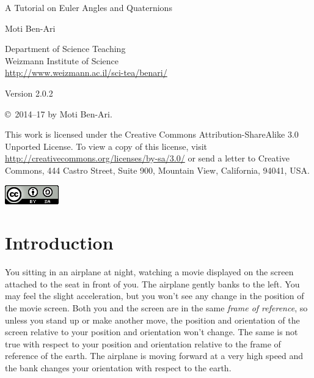 \documentclass[11pt,a4paper]{report}
\begin{document}
\thispagestyle{empty}

\begin{center}
\begin{huge}
\begin{bfseries}
A Tutorial on Euler Angles and Quaternions
\end{bfseries}
\end{huge}

\bigskip
\bigskip
\bigskip

{\LARGE Moti Ben-Ari}

\bigskip

{\Large Department of Science Teaching\\
Weizmann Institute of Science\\
\bigskip
\url{http://www.weizmann.ac.il/sci-tea/benari/}
}

\bigskip
\bigskip


\begin{Large}
Version 2.0.2
\end{Large}
\end{center}

\vfill

\begin{center}
\copyright{}\  2014--17 by Moti Ben-Ari.
\end{center}

This work is licensed under the Creative Commons Attribution-ShareAlike 3.0 Unported License. To view a copy of this license, visit \url{http://creativecommons.org/licenses/by-sa/3.0/} or send a letter to Creative Commons, 444 Castro Street, Suite 900, Mountain View, California, 94041, USA.

\begin{center}
\includegraphics[width=.2\textwidth]{../by-sa.png}
\end{center}

\clearpage
\setcounter{page}{1}

\chapter{Introduction}\label{s.intro}

You sitting in an airplane at night, watching a movie displayed on the screen attached to the seat in front of you. The airplane gently banks to the left. You may feel the slight acceleration, but you won't see any change in the position of the movie screen. Both you and the screen are in the same \emph{frame of reference}, so unless you stand up or make another move, the position and orientation of the screen relative to your position and orientation won't change. The same is not true with respect to your position and orientation relative to the frame of reference of the earth. The airplane is moving forward at a very high speed and the bank changes your orientation with respect to the earth.
\end{document}

